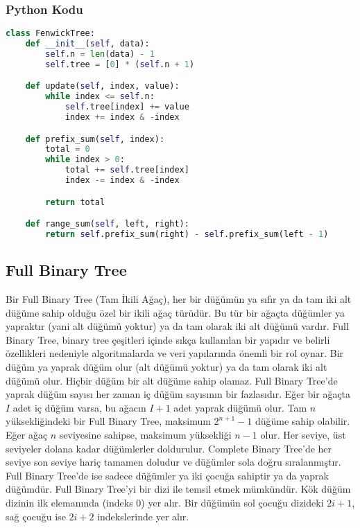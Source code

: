 \subsubsection{Python Kodu}

\begin{lstlisting}[language=Python]
class FenwickTree:
    def __init__(self, data):
        self.n = len(data) - 1
        self.tree = [0] * (self.n + 1)

    def update(self, index, value):
        while index <= self.n:
            self.tree[index] += value
            index += index & -index

    def prefix_sum(self, index):
        total = 0
        while index > 0:
            total += self.tree[index]
            index -= index & -index

        return total

    def range_sum(self, left, right):
        return self.prefix_sum(right) - self.prefix_sum(left - 1)
\end{lstlisting}

\newpage

\subsection{Full Binary Tree}

Bir Full Binary Tree (Tam İkili Ağaç), her bir düğümün ya sıfır ya da tam iki alt düğüme sahip olduğu özel bir ikili ağaç türüdür. Bu tür bir ağaçta düğümler ya yapraktır (yani alt düğümü yoktur) ya da tam olarak iki alt düğümü vardır. Full Binary Tree, binary tree çeşitleri içinde sıkça kullanılan bir yapıdır ve belirli özellikleri nedeniyle algoritmalarda ve veri yapılarında önemli bir rol oynar. Bir düğüm ya yaprak düğüm olur (alt düğümü yoktur) ya da tam olarak iki alt düğümü olur. Hiçbir düğüm bir alt düğüme sahip olamaz. Full Binary Tree'de yaprak düğüm sayısı her zaman iç düğüm sayısının bir fazlasıdır. Eğer bir ağaçta $I$ adet iç düğüm varsa, bu ağacın $I+1$ adet yaprak düğümü olur. Tam $n$ yüksekliğindeki bir Full Binary Tree, maksimum $2^{n+1} - 1$ düğüme sahip olabilir. Eğer ağaç $n$ seviyesine sahipse, maksimum yüksekliği $n-1$ olur. Her seviye, üst seviyeler dolana kadar düğümlerler doldurulur. Complete Binary Tree'de her seviye son seviye hariç tamamen doludur ve düğümler sola doğru sıralanmıştır. Full Binary Tree'de ise sadece düğümler ya iki çocuğa sahiptir ya da yaprak düğümdür. Full Binary Tree'yi bir dizi ile temsil etmek mümkündür. Kök düğüm dizinin ilk elemanında (indeks 0) yer alır. Bir düğümün sol çocuğu dizideki $2i+1$, sağ çocuğu ise $2i+2$ indekslerinde yer alır.

